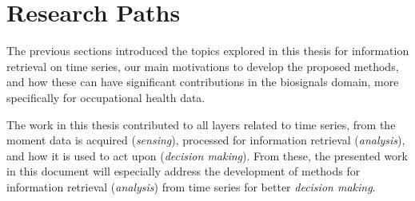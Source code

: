 
\section{Research Paths}

The previous sections introduced the topics explored in this thesis for information retrieval on time series, our main motivations to develop the proposed methods, and how these can have significant contributions in the biosignals domain, more specifically for occupational health data.
\par
The work in this thesis contributed to all layers related to time series, from the moment data is acquired (\textit{sensing}), processed for information retrieval (\textit{analysis}), and how it is used to act upon (\textit{decision making}). From these, the presented work in this document will especially address the development of methods for information retrieval (\textit{analysis}) from time series for better \textit{decision making}.


